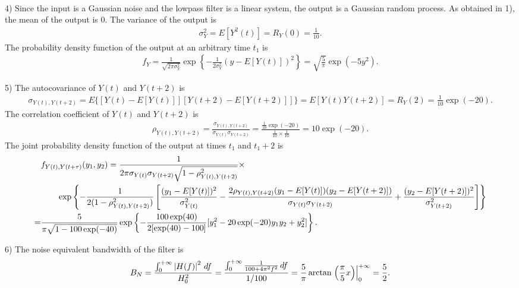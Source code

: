 \documentclass{assignment}
\begin{document}
\begin{sol}
\begin{align}
    \end{align}
    \item[4)] Since the input is a Gaussian noise and the lowpass filter is a linear system, the output is a Gaussian random process. As obtained in 1), the mean of the output is $0$. The variance of the output is
    \begin{align}
        \sigma_Y^2=E[Y^2(t)]=R_Y(0)=\frac{1}{10}.
    \end{align}
    The probability density function of the output at an arbitrary time $t_1$ is
    \begin{align}
        f_Y=\frac{1}{\sqrt{2\pi\sigma_Y^2}}\exp\left\{-\frac{1}{2\sigma_Y^2}(y-E[Y(t)])^2\right\}=\sqrt{\frac{5}{\pi}}\exp(-5y^2).
    \end{align}
    \item[5)] The autocovariance of $Y(t)$ and $Y(t+2)$ is
    \begin{align}
        \sigma_{Y(t),Y(t+2)}=E\{[Y(t)-E[Y(t)]][Y(t+2)-E[Y(t+2)]]\}=E[Y(t)Y(t+2)]=R_Y(2)=\frac{1}{10}\exp(-20).
    \end{align}
    The correlation coefficient of $Y(t)$ and $Y(t+2)$ is
    \begin{align}
        \rho_{Y(t),Y(t+2)}=\frac{\sigma_{Y(t),Y(t+2)}}{\sigma_{Y(t)}\sigma_{Y(t+2)}}=\frac{\frac{1}{10}\exp(-20)}{\frac{1}{10}\times\frac{1}{10}}=10\exp(-20).
    \end{align}
    The joint probability density function of the output at times $t_1$ and $t_1+2$ is
    \small\begin{align}
        \notag&f_{Y(t),Y(t+\tau)}(y_1,y_2)=\frac{1}{2\pi\sigma_{Y(t)}\sigma_{Y(t+2)}\sqrt{1-\rho_{Y(t),Y(t+2)}^2}}\times\\
        \notag&\qquad\exp\left\{-\frac{1}{2(1-\rho_{Y(t),Y(t+2)}^2)}\left[\frac{(y_1-E[Y(t)])^2}{\sigma_{Y(t)}^2}-\frac{2\rho_{Y(t),Y(t+2)}(y_1-E[Y(t)])(y_2-E[Y(t+2)])}{\sigma_{Y(t)}\sigma_{Y(t+2)}}+\frac{(y_2-E[Y(t+2)])^2}{\sigma_{Y(t+2)}^2}\right]\right\}\\
        =&\frac{5}{\pi\sqrt{1-100\exp(-40)}}\exp\left\{-\frac{100\exp(40)}{2[\exp(40)-100]}[y_1^2-20\exp(-20)y_1y_2+y_2^2]\right\}.
    \end{align}\normalsize
    \item[6)] The noise equivalent bandwidth of the filter is
    \begin{align}
        B_N=\frac{\int_0^{+\infty}\left\lvert H(f)\right\rvert^2\,df}{H_0^2}=\frac{\int_0^{+\infty}\frac{1}{100+4\pi^2f^2}\,df}{1/100}=\frac{5}{\pi}\arctan\left.\left(\frac{\pi}{5}x\right)\right\rvert_0^{+\infty}=\frac{5}{2}.
    \end{align}
\end{sol}
\end{document}
